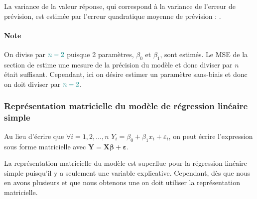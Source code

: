 \documentclass[french]{article}
\begin{document}
\begin{multicols*}{2}
La variance de la valeur réponse, qui correspond à la variance de l'erreur de prévision, est estimée par l'erreur quadratique moyenne de prévision : . 
	
\paragraph{Note}	On divise par $\textcolor{teal}{n - 2}$ puisque 2 paramètres, $\beta_{0}$ et $\beta_{1}$, sont estimés. Le MSE de la section de \textit{\underline{}} estime une mesure de la précision du modèle et donc diviser par $n$ était suffisant. Cependant, ici on désire estimer un paramètre sans-biais et donc on doit diviser par $\textcolor{teal}{n - 2}$.



\columnbreak
\subsubsection{Représentation matricielle du modèle de régression linéaire simple}
\begin{rappel_enhanced}[Contexte]
Au lieu d'écrire que $\forall i = 1, 2, \dots, n$ $Y_{i} = \beta_{0} + \beta_{1}x_{i} + \varepsilon_{i}$, on peut écrire l'expression sous forme matricielle avec $\bm{Y} = \bm{X} \bm{\beta} + \bm{\varepsilon}$.

\bigskip

La représentation matricielle du modèle est superflue pour la régression linéaire simple puisqu'il y a seulement une variable explicative. Cependant, dès que nous en avons plusieurs et que nous obtenons une \textit{\underline{}} on doit utiliser la représentation matricielle.
\end{rappel_enhanced}



\end{multicols*}
\end{document}
